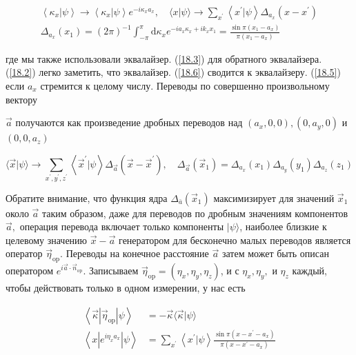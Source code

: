 \documentclass[main.tex]{subfiles}
\begin{document}
\begin{equation}\label{18.6}
	\begin{array}{l}
{\left\langle\kappa_{x} | \psi\right\rangle \rightarrow\left\langle\kappa_{x} | \psi\right\rangle e^{-i \kappa_{x} a_{x}}, \quad\langle x | \psi\rangle \rightarrow \sum_{x^{\prime}}\left\langle x^{\prime} | \psi\right\rangle \Delta_{a_{x}}\left(x-x^{\prime}\right)} \\
{\Delta_{a_{x}}\left(x_{1}\right)=(2 \pi)^{-1} \int_{-\pi}^{\pi} \mathrm{d} \kappa_{x} e^{-i a_{x} \kappa_{x}+i k_{x} x_{1}}=\frac{\sin \pi\left(x_{1}-a_{x}\right)}{\pi\left(x_{1}-a_{x}\right)}}
\end{array}
\end{equation}

где мы также использовали эквалайзер. (\ref{18.3}) для обратного эквалайзера. (\ref{18.2}) легко заметить, что эквалайзер. (\ref{18.6}) сводится к эквалайзеру. (\ref{18.5}) если $a_{x}$ стремится к целому числу. Переводы по совершенно произвольному вектору


$\vec{a}$ получаются как произведение дробных переводов над $\left(a_{x}, 0,0\right),\left(0, a_{y}, 0\right)$ и $\left(0,0, a_{z}\right)$

\begin{equation}\label{18.7}
	\langle\vec{x} | \psi\rangle \rightarrow \sum_{x^{\prime}, y^{\prime}, z^{\prime}}\left\langle\vec{x}^{\prime} | \psi\right\rangle \Delta_{\vec{a}}\left(\vec{x}-\vec{x}^{\prime}\right), \quad \Delta_{\vec{a}}\left(\vec{x}_{1}\right)=\Delta_{a_{x}}\left(x_{1}\right) \Delta_{a_{y}}\left(y_{1}\right) \Delta_{a_{z}}\left(z_{1}\right)
\end{equation}


Обратите внимание, что функция ядра $\Delta_{\bar{a}}\left(\vec{x}_{1}\right)$ максимизирует для значений $\vec{x}_{1}$ около $\vec{a}$ таким образом, даже для переводов по дробным значениям компонентов $\vec{a},$ операция перевода включает только компоненты $|\psi\rangle$, наиболее близкие к целевому значению $\vec{x}-\vec{a}$ генератором для бесконечно малых переводов является оператор $\vec{\eta}_{\mathrm{op}}$. Переводы на конечное расстояние $\vec{a}$ затем может быть описан оператором $e^{i \vec{a} \cdot \vec{n}_{\mathrm{op}}}$. Записываем $\vec{\eta}_{\mathrm{op}}=\left(\eta_{x}, \eta_{y}, \eta_{z}\right)$, и с $\eta_{x}, \eta_{y},$ и $\eta_{z}$ каждый, чтобы действовать только в одном измерении, у нас есть

\begin{equation}\label{18.8}
	\begin{aligned}
\left\langle\vec{\kappa}\left|\vec{\eta}_{\mathrm{op}}\right| \psi\right\rangle &=-\vec{\kappa}\langle\vec{\kappa} | \psi\rangle \\
\left\langle x\left|e^{i \eta_{x} a_{x}}\right| \psi\right\rangle &=\sum_{x^{\prime}}\left\langle x^{\prime} | \psi\right\rangle \frac{\sin \pi\left(x-x^{\prime}-a_{x}\right)}{\pi\left(x-x^{\prime}-a_{x}\right)}
\end{aligned}
\end{equation}
\end{document}
